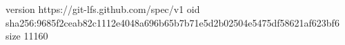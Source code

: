 version https://git-lfs.github.com/spec/v1
oid sha256:9685f2ceab82c1112e4048a696b65b7b71e5d2b02504e5475df58621af623bf6
size 11160
